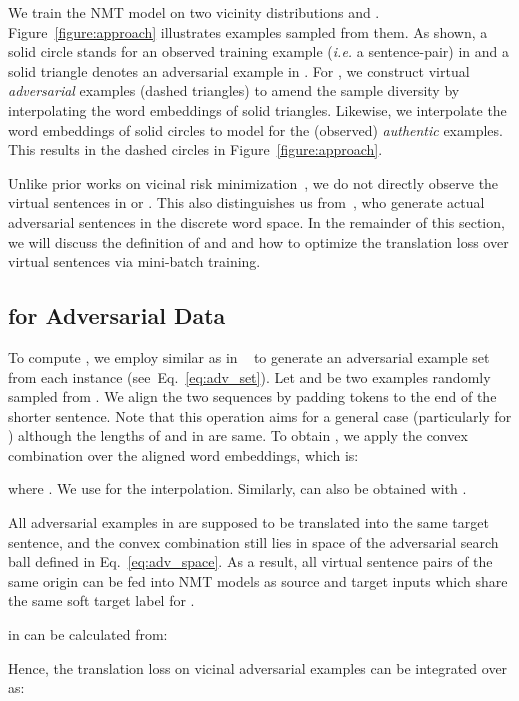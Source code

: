 \documentclass[11pt,a4paper]{article}
\newcommand{\ie}{\emph{i.e. }} \newcommand{\Ie}{\emph{I.e}}
\begin{document}
We train the NMT model on two vicinity distributions  and . Figure~\ref{figure:approach} illustrates examples sampled from them.
As shown, a solid circle stands for an observed training example (\ie a sentence-pair) in  and a solid triangle denotes an adversarial example in . For , we construct virtual \emph{adversarial} examples (dashed triangles) to amend the sample diversity by interpolating the word embeddings of solid triangles. Likewise, we interpolate the word embeddings of solid circles to model  for the (observed) \emph{authentic} examples. This results in the dashed circles in Figure~\ref{figure:approach}.



Unlike prior works on vicinal risk minimization~\cite{chapelle2001vicinal,Zhang:18}, we do not directly observe the virtual sentences in  or . This also distinguishes us from~\citet{Cheng:19}, who generate actual adversarial sentences in the discrete word space. In the remainder of this section, we will discuss the definition of  and  and how to optimize the translation loss over virtual sentences via mini-batch training.

\subsection{ for Adversarial Data}


To compute , we employ  similar as in ~\cite{Cheng:19} to generate 
an adversarial example set  from each instance  (see~Eq.~\eqref{eq:adv_set}). Let  and  be two examples randomly sampled from . We align the two sequences by padding tokens to the end of the shorter sentence. Note that this operation aims for a general case (particularly for ) although the lengths of  and  in  are same.
To obtain , we apply the convex combination  over the aligned word embeddings, which is:

where . We use  for the interpolation. Similarly,  can also be obtained with . 

All adversarial examples in  are supposed to be translated into the same target sentence, and the convex combination still lies in space of the adversarial search ball defined in Eq.~\eqref{eq:adv_space}. As a result, all virtual sentence pairs  of the same origin can be fed into NMT models as source and target inputs which share the same soft target label for .

 in  can be calculated from:


Hence, the translation loss on vicinal adversarial examples  can be integrated over  as:
\end{document}
